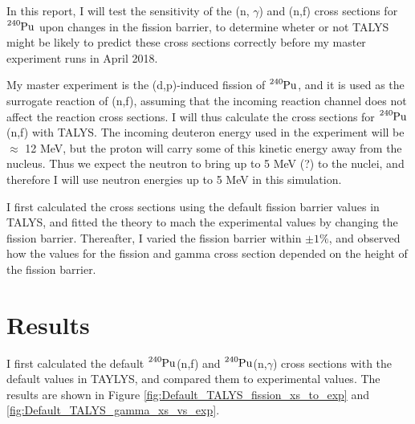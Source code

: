 \documentclass[]{article}
\begin{document}
\par 
\vspace{3mm}

In this report, I will test the sensitivity of the (n, $\gamma$) and (n,f) cross sections for $\ce{^{240}Pu}$ upon changes in the fission barrier, to determine wheter or not TALYS might be likely to predict these cross sections correctly before my master experiment runs in April 2018.

\par 
\vspace{3mm}

My master experiment is the (d,p)-induced fission of $\ce{^{240}Pu}$, and it is used as the surrogate reaction of (n,f), assuming that the incoming reaction channel does not affect the reaction cross sections. I will thus calculate the cross sections for $\ce{^{240}Pu}$(n,f) with TALYS. The incoming deuteron energy used in the experiment will be $\approx$ 12 MeV, but the proton will carry some of this kinetic energy away from the nucleus. Thus we expect the neutron to bring up to 5 MeV (?) to the nuclei, and therefore I will use neutron energies up to 5 MeV in this simulation. 
\par 
\vspace{3mm}

I first calculated the cross sections using the default fission barrier values in TALYS, and fitted the theory to mach the experimental values by changing the fission barrier. Thereafter, I varied the fission barrier within $\pm 1 \%$, and observed how the values for the fission and gamma cross section depended on the height of the fission barrier.

\section{Results}

I first calculated the default $\ce{^{240}Pu}$(n,f) and $\ce{^{240}Pu}$(n,$\gamma$) cross sections with the default values in TAYLYS, and compared them to experimental values. The results are shown in Figure \ref{fig:Default_TALYS_fission_xs_to_exp} and \ref{fig:Default_TALYS_gamma_xs_vs_exp}. 
\end{document}
